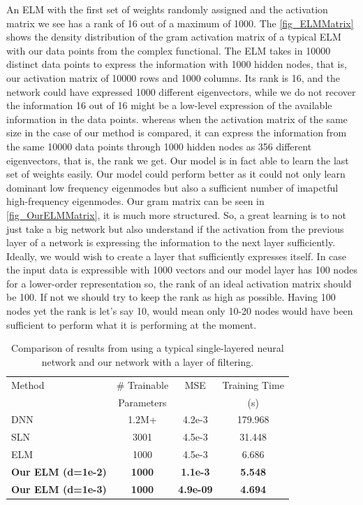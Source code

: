 \documentclass{article}
\begin{document}
An ELM with the first set of weights randomly assigned and the activation matrix we see has a rank of 16 out of a maximum of 1000. The \cref{fig_ELMMatrix} shows the density distribution of the gram activation matrix of a typical ELM with our data points from the complex functional. The ELM takes in 10000 distinct data points to express the information with 1000 hidden nodes, that is, our activation matrix of 10000 rows and 1000 columns. Its rank is 16, and the network could have expressed 1000 different eigenvectors, while we do not recover the information  16 out of 16 might be a low-level expression of the available information in the data points. whereas when the activation matrix of the same size in the case of our method is compared, it can express the information from the same 10000 data points through 1000 hidden nodes as 356 different eigenvectors, that is, the rank we get. Our model is in fact able to learn the last set of weights easily. Our model could perform better as it could not only learn dominant low frequency eigenmodes but also a sufficient number of imapctful high-frequency eigenmodes. Our gram matrix can be seen in \cref{fig_OurELMMatrix}, it is much more structured. So, a great learning is to not just take a big network but also understand if the activation from the previous layer of a network is expressing the information to the next layer sufficiently. Ideally, we would wish to create a layer that sufficiently expresses itself. In case the input data is expressible with 1000 vectors and our model layer has 100 nodes for a lower-order representation so, the rank of an ideal activation matrix should be 100. If not we should try to keep the rank as high as possible. Having 100 nodes yet the rank is let's say 10, would mean only 10-20 nodes would have been sufficient to perform what it is performing at the moment.  

\begin{table}
\centering 
\begin{tabular}{l c c c} 
 \hline
 Method & \# Trainable & MSE & Training Time \\
 & Parameters &  & (s) \\
 \hline
 DNN & 1.2M+ & 4.2e-3 & 179.968 \\
 SLN & 3001 & 4.5e-3 & 31.448 \\
 ELM & 1000 & 4.5e-3 & 6.686 	 \\ 
 \textbf{Our ELM (d=1e-2)} & \textbf{1000} & \textbf{1.1e-3} & \textbf{5.548} \\
 \textbf{Our ELM (d=1e-3)} & \textbf{1000} & \textbf{4.9e-09} & \textbf{4.694} \\
 \hline
\end{tabular}
\vspace{0.2cm}
\caption{Comparison of results from using a typical single-layered neural network and our network with a layer of filtering.}
\label{TableDataComparion}
\end{table}
\end{document}
